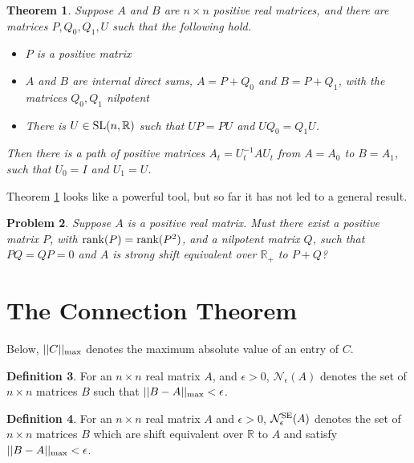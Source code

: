 \documentclass{amsart}
\newtheorem{theorem}{Theorem}[section]
\newtheorem{problem}[theorem]{Problem}
\theoremstyle{definition}
\newtheorem{definition}[theorem]{Definition}
\theoremstyle{remark}
\numberwithin{equation}{section}
\begin{document}
{{\begin{theorem} \label{positivemodels}
Suppose $A$ and $B$ are $n\times n$ positive real matrices, 
and there are matrices $P,Q_0,Q_1,U$ such that the following hold. 
\begin{itemize} 
\item $P$ is a positive matrix  

\item $A$ and $B$ are internal direct sums,  
$A=P+Q_0$ and $B=P+Q_1$,  with the matrices 
$Q_0,Q_1$  nilpotent 

\item There is $U\in \textnormal{SL}(n,\mathbb R) $ such that 
$UP=PU$ and $UQ_0=Q_1U$. 
\end{itemize} 

Then there is a path of positive matrices $A_t=U_t^{-1}AU_t$ 
from $A=A_0$ to $B=A_1$, such that $U_0=I$ and $U_1=U$. 
\end{theorem} 

Theorem \ref{positivemodels} looks like a powerful tool, 
but so far it has not led to a general result. 

\begin{problem} \label{positive modelproblem}
Suppose $A$ is a positive real matrix.
Must there exist a positive matrix $P$, with 
$\textnormal{rank}(P)=\textnormal{rank}(P^2)$,  and a nilpotent matrix 
$Q$,  such that $PQ=QP=0$ and 
$A$ is strong shift equivalent over $\mathbb R_+$ 
to $P+Q$? 
\end{problem} 


\section{The Connection Theorem} \label{connectionsec}

Below, $||C||_{\textnormal{max}}$ denotes the maximum absolute value of an 
entry of $C$. 

\begin{definition}\label{defnnbhd} 
 For an $n\times n$ real matrix $A$,  and $\epsilon >0$,  
$\mathcal N_{\epsilon}(A)$ denotes the set of $n\times n$ 
matrices $B$ such that  $||B-A||_{\textnormal{max}}< \epsilon $. 
\end{definition} 


\begin{definition} For an $n\times n$ real matrix $A$ and $\epsilon >0$,  
$\mathcal N_{\epsilon}^{\textnormal{SE}}(A)$ denotes the set of $n\times n$ 
matrices $B$ which are shift equivalent over $\mathbb R$ to $A$ and 
satisfy $||B-A||_{\textnormal{max}}< \epsilon $. 
\end{definition} 


}}
\end{document}
